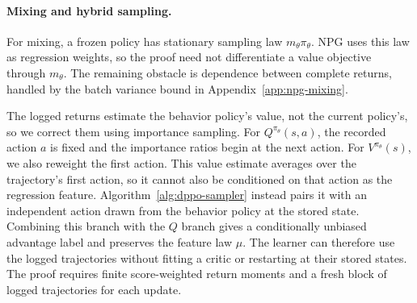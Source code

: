 \paragraph{Mixing and hybrid sampling.}
For mixing, a frozen policy has stationary sampling law $m_\theta\pi_\theta$. NPG uses this law as regression weights, so the proof need not differentiate a value objective through $m_\theta$. The remaining obstacle is dependence between complete returns, handled by the batch variance bound in Appendix~\ref{app:npg-mixing}.

The logged returns estimate the behavior policy's value, not the current policy's, so we correct them using importance sampling. For $Q^{\pi_\theta}(s,a)$, the recorded action $a$ is fixed and the importance ratios begin at the next action. For $V^{\pi_\theta}(s)$, we also reweight the first action. This value estimate averages over the trajectory's first action, so it cannot also be conditioned on that action as the regression feature. Algorithm~\ref{alg:dppo-sampler} instead pairs it with an independent action drawn from the behavior policy at the stored state. Combining this branch with the $Q$ branch gives a conditionally unbiased advantage label and preserves the feature law $\mu$. The learner can therefore use the logged trajectories without fitting a critic or restarting at their stored states. The proof requires finite score-weighted return moments and a fresh block of logged trajectories for each update.


